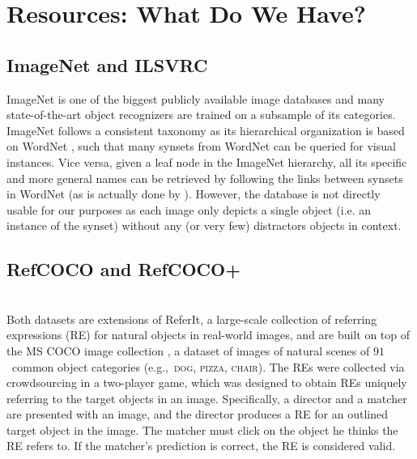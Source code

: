 \documentclass[runningheads]{llncs}
\newcommand{\referit}{ReferIt\xspace}
\newcommand{\refcoco}{RefCOCO\xspace}
\newcommand{\refcocop}{RefCOCO+\xspace}
\newcommand{\cat}[1]{\textsc{#1}}
\begin{document}
\section{Resources: What Do We Have?}
\label{sec:resources}

\subsection{ImageNet and ILSVRC}

ImageNet \cite{imagenet_cvpr09} is one of the biggest publicly available image databases and many state-of-the-art object recognizers are trained on a subsample of its categories. ImageNet follows a consistent taxonomy as its hierarchical organization is based on WordNet \cite{fellbaum1998wordnet}, such that many synsets from WordNet can be queried for visual instances.
Vice versa, given a leaf node in the ImageNet hierarchy, all its specific and more general names can be retrieved by following the links between synsets in WordNet (as is actually done by \cite{Ordonez:2016}).
However, the database is not directly usable for our purposes as each image only depicts a single object (i.e. an instance of the synset) without any (or very few) distractors objects in context. 


\subsection{\refcoco and \refcocop \cite{Yu2016}}~\\ 
Both datasets are extensions of \referit\cite{Kazemzadeh2014}, a large-scale collection of referring expressions (RE) for natural objects in real-world images, and are built on top of the MS COCO image collection \cite{mscoco}, 
a dataset of images of natural scenes of $91$~common object categories (e.g.,~\cat{dog, pizza, chair}). 
The REs were collected via crowdsourcing in a two-player game, which was designed to obtain REs uniquely referring to the target objects in an image. 
Specifically, a director and a matcher are presented with an image, and the director produces a RE for an outlined target object in the image. 
The matcher must click on the object he thinks the RE refers to. %
If the matcher's prediction is correct, the RE is considered valid.
\end{document}
